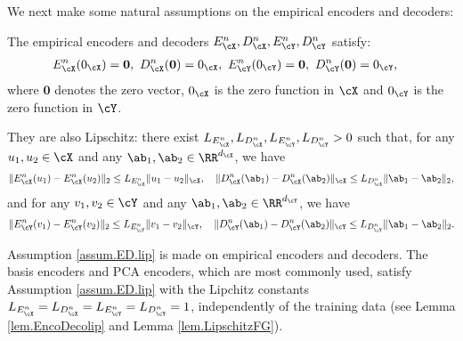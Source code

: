 \documentclass[11pt]{article} %
\begin{document}
We next make some natural assumptions on the empirical encoders and decoders:
\begin{assumption}\label{assum.ED.lip}
	The empirical encoders and decoders $E^n_{\cX},D^n_{\cX},E^n_{\cY},D^n_{\cY}$ satisfy:
	\begin{align*}
		&E^n_{\cX}(0_{\cX})=\mathbf{0},\ D^n_{\cX}(\mathbf{0})=0_{\cX},\ E^n_{\cY}(0_{\cY})=\mathbf{0},\ D^n_{\cY}(\mathbf{0})=0_{\cY},
	\end{align*}
where $\mathbf{0}$ denotes the zero vector, $0_{\cX}$ is the zero function in $\cX$ and $0_{\cY}$ is the zero function in $\cY$.

	They are also Lipschitz: there exist $L_{E_{\cX}^n},L_{D_{\cX}^n},L_{E_{\cY}^n},L_{D_{\cY}^n} >0$ such that, for any $u_1,u_2\in \cX$ and any $\ab_1,\ab_2\in \RR^{d_{\cX}}$, we have
	\begin{align*}
		 \|E_{\cX}^n(u_1)-E_{\cX}^n(u_2)\|_{2}\leq L_{E_{\cX}^n}\|u_1-u_2\|_{\cX}, \quad \|D_{\cX}^n(\ab_1)-D_{\cX}^n(\ab_2)\|_{\cX}\leq L_{D_{\cX}^n}\|\ab_1-\ab_2\|_2,
	\end{align*}
and for any $v_1,v_2\in \cY$ and any $\ab_1,\ab_2\in \RR^{d_{\cY}}$, we have
	\begin{align*}
		 \|E_{\cY}^n(v_1)-E_{\cY}^n(v_2)\|_{2}\leq L_{E_{\cY}^n}\|v_1-v_2\|_{\cY}, \quad \|D_{\cY}^n(\ab_1)-D_{\cY}^n(\ab_2)\|_{\cY}\leq L_{D_{\cY}^n}\|\ab_1-\ab_2\|_2.
	\end{align*}
\end{assumption}
\begin{remark} 
Assumption \ref{assum.ED.lip} is made on empirical encoders and decoders. The basis encoders and PCA encoders, which are most commonly used, satisfy Assumption \ref{assum.ED.lip} with the Lipchitz constants $L_{E_{\cX}^n}=L_{D_{\cX}^n}=L_{E_{\cY}^n}=L_{D_{\cY}^n}=1$,  independently of the training data (see Lemma \ref{lem.EncoDecolip} and Lemma \ref{lem.LipschitzFG}). 
\end{remark}
	
\end{document}
